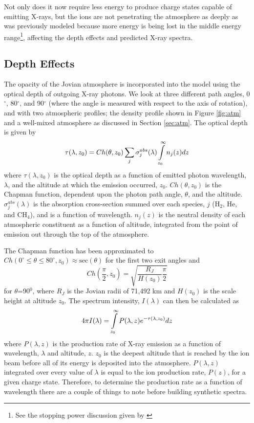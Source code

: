 \documentclass[draft]{agujournal2018}
\begin{document}
Not only does it now require less energy to produce charge states capable of emitting X-rays, but the ions are not penetrating the atmosphere as deeply as was previously modeled because more energy is being lost in the middle energy range\footnote{See the stopping power discussion given by \citet{schultz2018}}, affecting the depth effects and predicted X-ray spectra.

\subsection{Depth Effects}

The opacity of the Jovian atmosphere is incorporated into the model using the optical depth of outgoing X-ray photons.
We look at three different path angles, 0$^{\circ}$, 80$^{\circ}$, and 90$^{\circ}$ (where the angle is measured with respect to the axis of rotation), and with two atmospheric profiles; the density profile shown in Figure \ref{fig:atm} and a well-mixed atmosphere as discussed in Section \ref{sec:atm}.
The optical depth is given by
\begin{equation}
    \tau(\lambda,z_{0})=Ch(\theta,z_{0})\sum_{j}\sigma_{j}^{abs}(\lambda)\int\displaylimits_{z_{0}}^{\infty}n_{j}(z)dz
    \label{eqn:tau}
\end{equation}
where $\tau(\lambda,z_{0})$ is the optical depth as a function of emitted photon wavelength, $\lambda$, and the altitude at which the emission occurred, $z_{0}$.
$Ch(\theta,z_{0})$ is the Chapman function, dependent upon the photon path angle, $\theta$, and the altitude.
$\sigma_j^{abs}(\lambda)$ is the absorption cross-section summed over each species, $j$ (H$_2$, He, and CH$_4$), and is a function of wavelength.
$n_j(z)$ is the neutral density of each atmospheric constituent as a function of altitude, integrated from the point of emission out through the top of the atmosphere.

The Chapman function has been approximated to $Ch(0^{\circ} \leq \theta \leq 80^{\circ},z_{0}) \approx \mathrm{sec}(\theta)$ for the first two exit angles and
\begin{equation}
    Ch(\frac{\pi}{2},z_{0})=\sqrt{\frac{R_J}{H(z_0)}\frac{\pi}{2}}
    \label{eqn:Chap}
\end{equation}
for $\theta$=90$^{0}$, where $R_J$ is the Jovian radii of 71,492 km and $H(z_0)$ is the scale height at altitude $z_0$.
The spectrum intensity, $I(\lambda)$ can then be calculated as
\begin{equation}
    4\pi I(\lambda)=\int\displaylimits_{z_0}^{\infty}P(\lambda,z)e^{-\tau(\lambda,z_0)}dz
    \label{eqn:I}
\end{equation}
where $P(\lambda,z)$ is the production rate of X-ray emission as a function of wavelength, $\lambda$ and altitude, $z$.
$z_0$ is the deepest altitude that is reached by the ion beam before all of its energy is deposited into the atmosphere.
$P(\lambda,z)$ integrated over every value of $\lambda$ is equal to the ion production rate, $P(z)$, for a given charge state.
Therefore, to determine the production rate as a function of wavelength there are a couple of things to note before building synthetic spectra.
\end{document}
